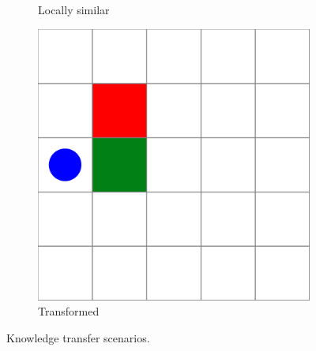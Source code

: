 \begin{figure}
\begin{subfigure}[t]{0.25\linewidth}
        \caption{\scriptsize Locally similar}  
        \label{fig:motivation_a2t}
    \end{subfigure}
    \hfill
    \begin{subfigure}[t]{0.25\linewidth}   
        \centering 
        \includegraphics[width=\textwidth]{figures/iterative_validation/gridworld4.pdf}
        \caption{\scriptsize Transformed}
        \label{fig:motivation_sat}
    \end{subfigure}
    \caption{Knowledge transfer scenarios.}
    \label{fig:motivation}
\end{figure}

